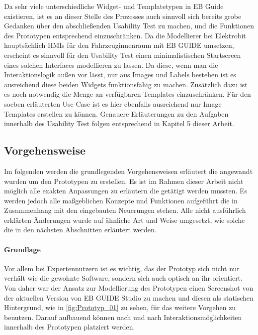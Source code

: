 Da sehr viele unterschiedliche Widget- und Templatetypen in EB Guide existieren, ist es an dieser Stelle des Prozesses auch sinnvoll sich bereits grobe Gedanken über den abschließenden Usability Test zu machen, und die Funktionen des Prototypen entsprechend einzuschränken.
Da die Modellierer bei Elektrobit hauptsächlich HMIs für den Fahrzeuginnenraum mit EB GUIDE umsetzen, erscheint es sinnvoll für den Usability Test einen minimalistischen Startscreen eines solchen Interfaces modellieren zu lassen.
Da diese, wenn man die Interaktionslogik außen vor lässt, nur aus Images und Labels bestehen ist es ausreichend diese beiden Widgets funktionsfähig zu machen.
Zusätzlich dazu ist es noch notwendig die Menge an verfügbaren Templates einzuschränken.
Für den soeben erläuterten Use Case ist es hier ebenfalls ausreichend nur Image Templates erstellen zu können.
Genauere Erläuterungen zu den Aufgaben innerhalb des Usability Test folgen entsprechend in Kapitel 5 dieser Arbeit.


\subsection{Vorgehensweise}
Im folgenden werden die grundlegenden Vorgehensweisen erläutert die angewandt wurden um den Prototypen zu erstellen.
Es ist im Rahmen dieser Arbeit nicht möglich alle exakten Anpassungen zu erläutern die getätigt werden mussten.
Es werden jedoch alle maßgeblichen Konzepte und Funktionen aufgeführt die in Zusammenhang mit den eingebauten Neuerungen stehen.
Alle nicht ausführlich erklärten Änderungen wurde auf ähnliche Art und Weise umgesetzt, wie solche die in den nächsten Abschnitten erläutert werden.

\paragraph{Grundlage}
Vor allem bei Expertennutzern ist es wichtig, das der Prototyp sich nicht nur verhält wie die  gewohnte Software, sondern sich auch optisch an ihr orientiert.
Von daher war der Ansatz zur Modellierung des Prototypen einen Screenshot von der aktuellen Version von EB GUIDE Studio zu machen und diesen als statischen Hintergrund, wie in \cref{fig:Prototyp_01} zu sehen, für das weitere Vorgehen zu benutzen.
Darauf aufbauend können nach und nach Interaktionsmöglichkeiten innerhalb des Prototypen platziert werden.

